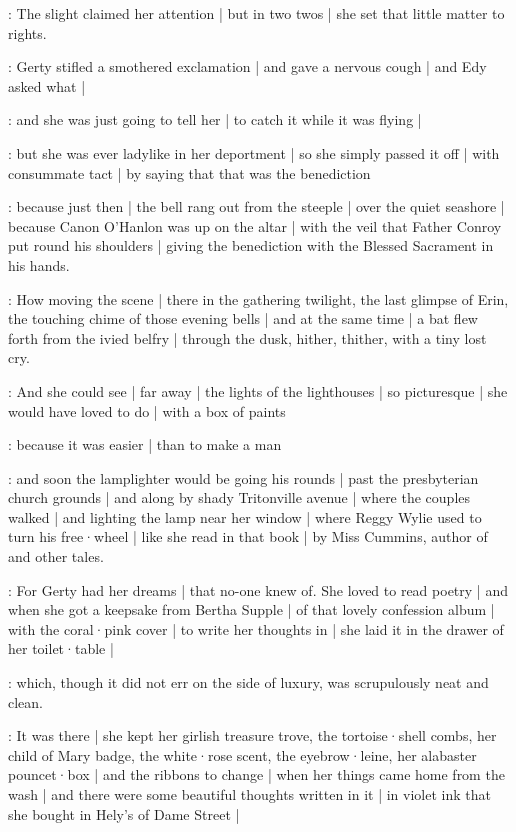 :
The slight 
claimed her attention |
but in two twos |
she set that little matter to rights.

\gertyReal:
Gerty stifled a smothered exclamation |
and gave a nervous cough |
and Edy asked what |

\gertyJudgy:
and she was just going to tell her |
to catch it while it was flying |

\gertyReal:
but she was ever ladylike in her deportment |
so she simply passed it off |
with consummate tact |
by saying that that was the benediction

\Nrelig:
because just then |
the bell rang out from the steeple |%
over the quiet seashore |
because Canon O'Hanlon
was up on the altar |
with the veil
that Father Conroy put round his shoulders |
giving the benediction
with the Blessed Sacrament in his hands.

:
How moving the scene |
there in the gathering twilight,
the last glimpse of Erin,
the touching chime of those evening bells |
and at the same time |
a bat
flew forth from the ivied belfry |
through the dusk,
hither,
thither,
with a tiny lost cry.

\gertyNovel:
And she could see |
far away |
the lights of the lighthouses |
so picturesque |
she would have loved to do |
with a box of paints

\gertyReal:
because it was easier |
than to make a man

\gertyNovel:
and soon the lamplighter would be going his rounds |
past the presbyterian church grounds |%
and along by shady Tritonville avenue |
where the couples walked |
and lighting the lamp near her window |
where Reggy Wylie used to turn his free·wheel |
like she read in that book |
 by Miss Cummins,
author of  and other tales.

\gertyRomantic:
For Gerty had her dreams |
that no-one knew of.
She loved to read poetry |
and when she got a keepsake from Bertha Supple |
of that lovely confession album |
with the coral·pink cover |
to write her thoughts in |
she laid it in the drawer of her toilet·table |

\gertyReal:
which,
though it did not err on the side of luxury,
was scrupulously neat and clean.

\gertyNovel:
It was there |
she kept her girlish treasure trove,
the tortoise·shell combs,
her child of Mary badge,
the white·rose scent,
the eyebrow·leine,%
her alabaster pouncet·box |
and the ribbons to change |
when her things came home from the wash |
and there were
some beautiful thoughts written in it |
in violet ink that she bought in Hely's of Dame Street |

